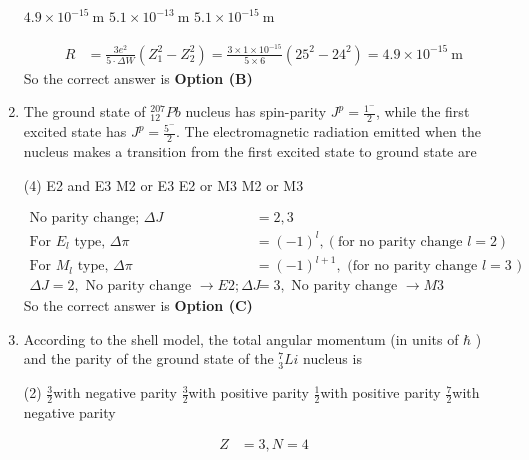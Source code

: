 \begin{enumerate}
\begin{tasks}
\task[\textbf{B.}] $4.9 \times 10^{-15} \mathrm{~m}$
\task[\textbf{C.}] $5.1 \times 10^{-13} \mathrm{~m}$
\task[\textbf{D.}] $5.1 \times 10^{-15} \mathrm{~m}$
\end{tasks}
\begin{answer}
\begin{align*}
R&=\frac{3 e^{2}}{5 \cdot \Delta W}\left(Z_{1}^{2}-Z_{2}^{2}\right)=\frac{3 \times 1 \times 10^{-15}}{5 \times 6}\left(25^{2}-24^{2}\right)=4.9 \times 10^{-15} \mathrm{~m}
\end{align*}
So the correct answer is \textbf{Option (B)}
\end{answer}
\item The ground state of ${ }_{12}^{207} P b$ nucleus has spin-parity $J^{p}=\frac{1^{-}}{2}$, while the first excited state has $J^{p}=\frac{5^{-}}{2}$. The electromagnetic radiation emitted when the nucleus makes a transition from the first excited state to ground state are
{}
\begin{tasks}(4)
\task[\textbf{A.}] E2 and E3
\task[\textbf{B.}] M2 or E3
\task[\textbf{C.}] E2 or M3
\task[\textbf{D.}] M2 or M3
\end{tasks}
\begin{answer}
\begin{align*}
\text{No parity change; }\Delta J&=2,3\\
\text{For }E_{l}\text{ type, }\Delta \pi&=(-1)^{l}, (\text{for no parity change }l=2 )\\
\text{For $M_{l}$ type, }\Delta \pi&=(-1)^{l+1},\text{ (for no parity change $l=3$ )}\\
\Delta J=2,\text{ No parity change }\rightarrow E 2 ; \Delta J&=3,\text{ No parity change } \rightarrow M 3
\end{align*}
So the correct answer is \textbf{Option (C)}
\end{answer}	
	\item According to the shell model, the total angular momentum (in units of $\hbar$ ) and the parity
	of the ground state of the $ {^7_3}Li$ nucleus is
{	}
\begin{tasks}(2)
\task[\textbf{A.}] $\frac{3}{2}$with negative parity
\task[\textbf{B.}] $\frac{3}{2}$with positive parity
\task[\textbf{C.}] $\frac{1}{2}$with positive parity
\task[\textbf{D.}] $\frac{7}{2}$with negative parity
\end{tasks}
\begin{answer}
\begin{align*}
Z&=3,N=4\\

\end{align*}
\end{answer}
\end{enumerate}
